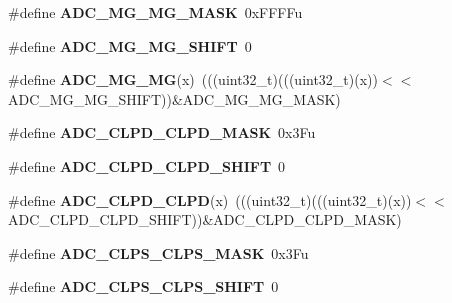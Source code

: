 \begin{DoxyCompactItemize}
\item 
\#define {\bfseries A\+D\+C\+\_\+\+M\+G\+\_\+\+M\+G\+\_\+\+M\+A\+SK}~0x\+F\+F\+F\+Fu\hypertarget{group__ADC__Register__Masks_ga9f415258af1bad0159dd605efccd043b}{}\label{group__ADC__Register__Masks_ga9f415258af1bad0159dd605efccd043b}

\item 
\#define {\bfseries A\+D\+C\+\_\+\+M\+G\+\_\+\+M\+G\+\_\+\+S\+H\+I\+FT}~0\hypertarget{group__ADC__Register__Masks_ga4b2717da089f0de5bd41ef91001b7cfe}{}\label{group__ADC__Register__Masks_ga4b2717da089f0de5bd41ef91001b7cfe}

\item 
\#define {\bfseries A\+D\+C\+\_\+\+M\+G\+\_\+\+MG}(x)~(((uint32\+\_\+t)(((uint32\+\_\+t)(x))$<$$<$A\+D\+C\+\_\+\+M\+G\+\_\+\+M\+G\+\_\+\+S\+H\+I\+FT))\&A\+D\+C\+\_\+\+M\+G\+\_\+\+M\+G\+\_\+\+M\+A\+SK)\hypertarget{group__ADC__Register__Masks_gaca09277ff124324eca091b84eb116176}{}\label{group__ADC__Register__Masks_gaca09277ff124324eca091b84eb116176}

\item 
\#define {\bfseries A\+D\+C\+\_\+\+C\+L\+P\+D\+\_\+\+C\+L\+P\+D\+\_\+\+M\+A\+SK}~0x3\+Fu\hypertarget{group__ADC__Register__Masks_gaae8d6090ede9d73497ae3e0b4fa2c6cd}{}\label{group__ADC__Register__Masks_gaae8d6090ede9d73497ae3e0b4fa2c6cd}

\item 
\#define {\bfseries A\+D\+C\+\_\+\+C\+L\+P\+D\+\_\+\+C\+L\+P\+D\+\_\+\+S\+H\+I\+FT}~0\hypertarget{group__ADC__Register__Masks_ga14a354b0de262fc93f30472e99bbe9bc}{}\label{group__ADC__Register__Masks_ga14a354b0de262fc93f30472e99bbe9bc}

\item 
\#define {\bfseries A\+D\+C\+\_\+\+C\+L\+P\+D\+\_\+\+C\+L\+PD}(x)~(((uint32\+\_\+t)(((uint32\+\_\+t)(x))$<$$<$A\+D\+C\+\_\+\+C\+L\+P\+D\+\_\+\+C\+L\+P\+D\+\_\+\+S\+H\+I\+FT))\&A\+D\+C\+\_\+\+C\+L\+P\+D\+\_\+\+C\+L\+P\+D\+\_\+\+M\+A\+SK)\hypertarget{group__ADC__Register__Masks_gad24bf778e8245118707b43a195a7ddf3}{}\label{group__ADC__Register__Masks_gad24bf778e8245118707b43a195a7ddf3}

\item 
\#define {\bfseries A\+D\+C\+\_\+\+C\+L\+P\+S\+\_\+\+C\+L\+P\+S\+\_\+\+M\+A\+SK}~0x3\+Fu\hypertarget{group__ADC__Register__Masks_gaccedf61066feb0b1c6d6bd7794d2a79c}{}\label{group__ADC__Register__Masks_gaccedf61066feb0b1c6d6bd7794d2a79c}

\item 
\#define {\bfseries A\+D\+C\+\_\+\+C\+L\+P\+S\+\_\+\+C\+L\+P\+S\+\_\+\+S\+H\+I\+FT}~0\hypertarget{group__ADC__Register__Masks_ga94f5e6c337622e8c4b8d03201e1c2d11}{}\label{group__ADC__Register__Masks_ga94f5e6c337622e8c4b8d03201e1c2d11}


\end{DoxyCompactItemize}
